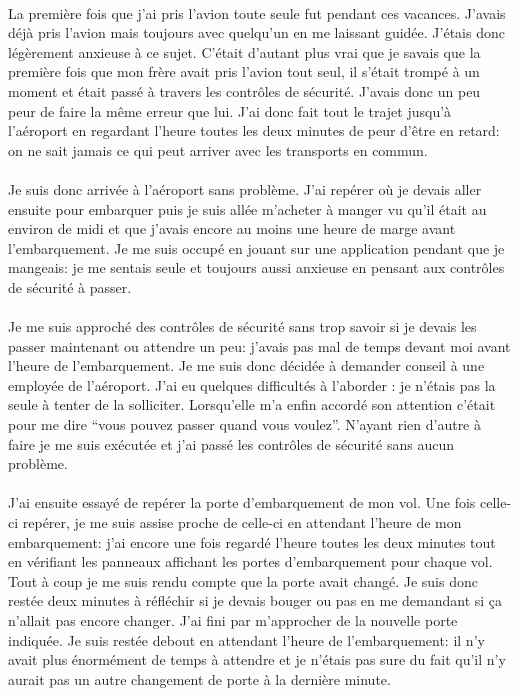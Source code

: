 \paragraph{} La première fois que j'ai pris l'avion toute seule fut pendant ces
vacances. J'avais déjà pris l'avion mais toujours avec quelqu'un en me laissant
guidée. J'étais donc légèrement anxieuse à ce sujet. C'était d'autant plus vrai
que je savais que la première fois que mon frère avait pris l'avion tout seul,
il s'était trompé à un moment et était passé à travers les contrôles de
sécurité. J'avais donc un peu peur de faire la même erreur que lui. J'ai donc
fait tout le trajet jusqu'à l'aéroport en regardant l'heure toutes les deux
minutes de peur d'être en retard: on ne sait jamais ce qui peut arriver avec
les transports en commun.

\paragraph{} Je suis donc arrivée à l'aéroport sans problème. J'ai repérer où
je devais aller ensuite pour embarquer puis je suis allée m'acheter à manger vu
qu'il était au environ de midi et que j'avais encore au moins une heure de
marge avant l'embarquement. Je me suis occupé en jouant sur une application
pendant que je mangeais: je me sentais seule et toujours aussi anxieuse en
pensant aux contrôles de sécurité à passer.

\paragraph{} Je me suis approché des contrôles de sécurité sans trop savoir si
je devais les passer maintenant ou attendre un peu: j'avais pas mal de temps
devant moi avant l'heure de l'embarquement. Je me suis donc décidée à demander
conseil à une employée de l'aéroport. J'ai eu quelques difficultés à l'aborder
: je n'étais pas la seule à tenter de la solliciter. Lorsqu'elle m'a enfin
accordé son attention c'était pour me dire ``vous pouvez passer quand vous
voulez''. N'ayant rien d'autre à faire je me suis exécutée et j'ai passé les
contrôles de sécurité sans aucun problème.

\paragraph{} J'ai ensuite essayé de repérer la porte d'embarquement de mon vol.
Une fois celle-ci repérer, je me suis assise proche de celle-ci en attendant
l'heure de mon embarquement: j'ai encore une fois regardé l'heure toutes les
deux minutes tout en vérifiant les panneaux affichant les portes d'embarquement
pour chaque vol. Tout à coup je me suis rendu compte que la porte avait changé.
Je suis donc restée deux minutes à réfléchir si je devais bouger ou pas en me
demandant si ça n'allait pas encore changer. J'ai fini par m'approcher de la
nouvelle porte indiquée. Je suis restée debout en attendant l'heure de
l'embarquement: il n'y avait plus énormément de temps à attendre et je n'étais
pas sure du fait qu'il n'y aurait pas un autre changement de porte à la
dernière minute.

